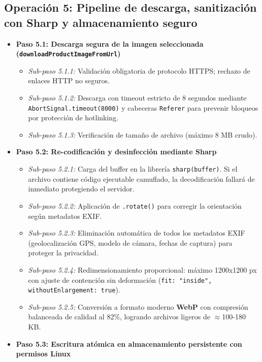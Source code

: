 \documentclass[11pt,a4paper]{article}
\begin{document}
\subsection{Operación 5: Pipeline de descarga, sanitización con Sharp y almacenamiento seguro}
\begin{itemize}
    \item \textbf{Paso 5.1: Descarga segura de la imagen seleccionada (\texttt{downloadProductImageFromUrl})}
    \begin{itemize}
        \item \textit{Sub-paso 5.1.1:} Validación obligatoria de protocolo HTTPS; rechazo de enlaces HTTP no seguros.
        \item \textit{Sub-paso 5.1.2:} Descarga con timeout estricto de 8 segundos mediante \texttt{AbortSignal.timeout(8000)} y cabeceras \texttt{Referer} para prevenir bloqueos por protección de hotlinking.
        \item \textit{Sub-paso 5.1.3:} Verificación de tamaño de archivo (máximo 8 MB crudo).
    \end{itemize}
    \item \textbf{Paso 5.2: Re-codificación y desinfección mediante Sharp}
    \begin{itemize}
        \item \textit{Sub-paso 5.2.1:} Carga del buffer en la librería \texttt{sharp(buffer)}. Si el archivo contiene código ejecutable camuflado, la decodificación fallará de inmediato protegiendo el servidor.
        \item \textit{Sub-paso 5.2.2:} Aplicación de \texttt{.rotate()} para corregir la orientación según metadatos EXIF.
        \item \textit{Sub-paso 5.2.3:} Eliminación automática de todos los metadatos EXIF (geolocalización GPS, modelo de cámara, fechas de captura) para proteger la privacidad.
        \item \textit{Sub-paso 5.2.4:} Redimensionamiento proporcional: máximo 1200x1200 px con ajuste de contención sin deformación (\texttt{fit: "inside", withoutEnlargement: true}).
        \item \textit{Sub-paso 5.2.5:} Conversión a formato moderno \textbf{WebP} con compresión balanceada de calidad al 82\%, logrando archivos ligeros de $\approx$100-180 KB.
    \end{itemize}
    \item \textbf{Paso 5.3: Escritura atómica en almacenamiento persistente con permisos Linux}
    \begin{itemize}

\end{itemize}
\end{itemize}
\end{document}
